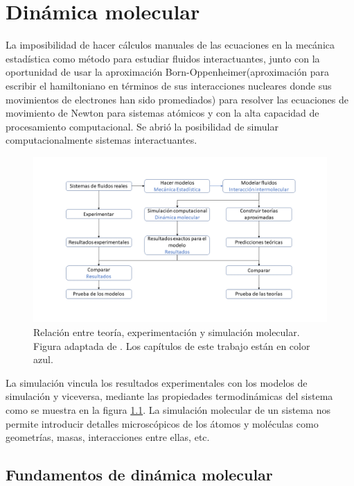 
\chapter{Dinámica molecular}

La imposibilidad de hacer cálculos manuales de las ecuaciones en la mecánica estadística como método para estudiar fluidos interactuantes, junto con la oportunidad de usar la aproximación Born-Oppenheimer(aproximación para escribir el hamiltoniano en términos de sus interacciones nucleares donde sus movimientos de electrones han sido promediados) para resolver las ecuaciones de movimiento de Newton para sistemas atómicos y con la alta capacidad de procesamiento computacional. Se abrió la posibilidad de simular computacionalmente sistemas interactuantes.\\

\begin{figure}[!h]
    \centering
    \includegraphics[width=.8\textwidth,keepaspectratio=true]{MD/experimentsimulationtheoryfig.png}
    \caption{Relación entre teoría, experimentación y simulación molecular. Figura adaptada de \cite{Allen2017}. Los capítulos de este trabajo están en color azul.}
    \label{fig:conteexpsim}
\end{figure}

La simulación vincula los resultados experimentales con los modelos de simulación y viceversa, mediante las propiedades termodinámicas del sistema como se muestra en la figura \ref{fig:conteexpsim}. La simulación molecular de un sistema nos permite introducir detalles microscópicos de los átomos y moléculas como geometrías, masas, interacciones entre ellas, etc.\\

\section{Fundamentos de dinámica molecular}

